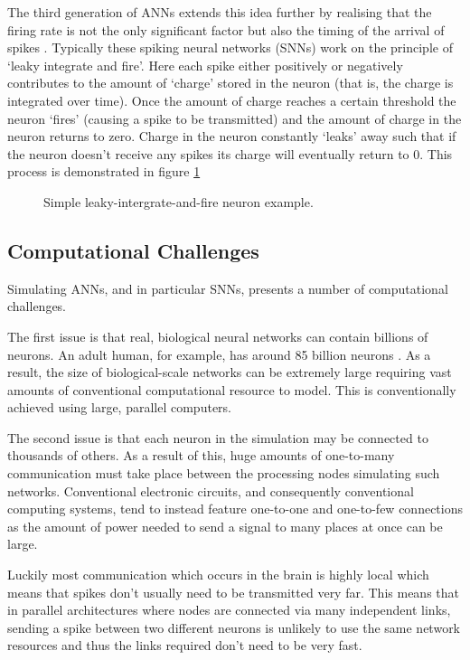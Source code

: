			The third generation of ANNs extends this idea further by realising that
			the firing rate is not the only significant factor but also the timing of
			the arrival of spikes \cite{maass01}. Typically these spiking neural
			networks (SNNs) work on the principle of `leaky integrate and fire'. Here
			each spike either positively or negatively contributes to the amount of
			`charge' stored in the neuron (that is, the charge is integrated over
			time). Once the amount of charge reaches a certain threshold the neuron
			`fires' (causing a spike to be transmitted) and the amount of charge in
			the neuron returns to zero. Charge in the neuron constantly `leaks' away
			such that if the neuron doesn't receive any spikes its charge will
			eventually return to 0. This process is demonstrated in figure
			\ref{fig:snn-example}
			
			\begin{figure}
				\center
				
				\caption{Simple leaky-intergrate-and-fire neuron example.}
				\label{fig:snn-example}
			\end{figure}
		
		\subsection{Computational Challenges}
			
			Simulating ANNs, and in particular SNNs, presents a number of
			computational challenges.
			
			The first issue is that real, biological neural networks can contain
			billions of neurons. An adult human, for example, has around 85 billion
			neurons \cite{herculano09}. As a result, the size of biological-scale
			networks can be extremely large requiring vast amounts of conventional
			computational resource to model. This is conventionally achieved using
			large, parallel computers.
			
			The second issue is that each neuron in the simulation may be connected to
			thousands of others. As a result of this, huge amounts of one-to-many
			communication must take place between the processing nodes simulating such
			networks. Conventional electronic circuits, and consequently conventional
			computing systems, tend to instead feature one-to-one and one-to-few
			connections as the amount of power needed to send a signal to many places
			at once can be large.
			
			Luckily most communication which occurs in the brain is highly local which
			means that spikes don't usually need to be transmitted very far. This
			means that in parallel architectures where nodes are connected via many
			independent links, sending a spike between two different neurons is
			unlikely to use the same network resources and thus the links required
			don't need to be very fast.
			
